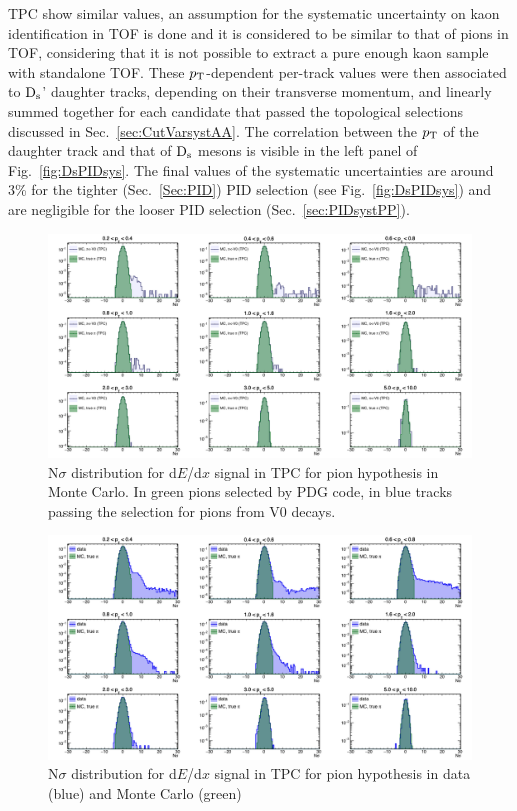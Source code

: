 TPC show similar values, an assumption for the systematic uncertainty 
on kaon identification in TOF is done and it is considered to be similar to that of pions in TOF,
considering that it is not possible to extract a pure enough kaon
sample with standalone TOF.
These $p_{\rm T}$-dependent per-track values were then associated to
${\rm D_s}$' daughter tracks, depending on their transverse momentum, and linearly summed together 
for each candidate that passed the topological selections discussed 
in Sec.~\ref{sec:CutVarsystAA}. The correlation between the
$p_{\rm T}$ of the daughter track and that of ${\rm D_s}$ mesons is visible in the
left panel of Fig.~\ref{fig:DsPIDsys}.
The final values of the systematic uncertainties are around 
3\% for the tighter (Sec.~\ref{Sec:PID}) PID selection (see Fig.~\ref{fig:DsPIDsys}) and are negligible for the
looser PID selection (Sec.~\ref{sec:PIDsystPP}).

\begin{figure}[!h]
 \centering
 \includegraphics[angle=0, width=15cm]{./FigCap5/PionTPC_MC.png}
 \caption{N$\sigma$ distribution for d$E$/d$x$ signal in TPC for pion hypothesis in Monte Carlo. In green pions selected by PDG code, in blue tracks passing the selection for pions from V0 decays.}
 \label{fig:MCPionsTPC} 
\end{figure}

\begin{figure}[!h]
 \centering
 \includegraphics[angle=0, width=15cm]{./FigCap5/PionTPC_DataMC.png}
 \caption{N$\sigma$ distribution for d$E$/d$x$ signal in TPC for pion hypothesis in data (blue) and Monte Carlo (green)}
 \label{fig:DataPionsTPC} 
\end{figure}

